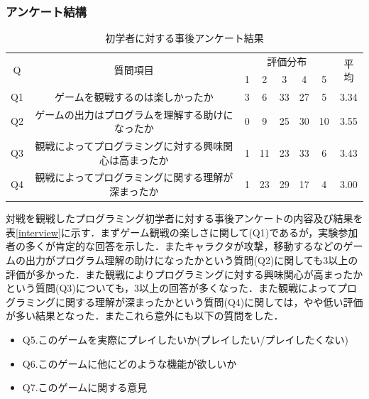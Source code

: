 \subsubsection{アンケート結構}


\begin{table}[h]
  \centering
  \caption{初学者に対する事後アンケート結果}
  \label{beginner_interview}
    \begin{tabular}{|c|c|c|c|c|c|c|c|} \hline
      \multirow{2}{*}{Q} & \multirow{2}{*}{質問項目} & \multicolumn{5}{c}{評価分布} & \multirow{2}{*}{平均} \\
      & & 1 & 2 & 3 & 4 & 5 & \\ \hline\hline
      Q1 & ゲームを観戦するのは楽しかったか & 3 & 6 & 33 & 27 & 5 & 3.34\\ \hline
      Q2 & ゲームの出力はプログラムを理解する助けになったか & 0 & 9 & 25 & 30 & 10 & 3.55\\ \hline
      Q3 & 観戦によってプログラミングに対する興味関心は高まったか & 1 & 11 & 23 & 33 & 6 & 3.43\\ \hline
      Q4 & 観戦によってプログラミングに関する理解が深まったか & 1 & 23 & 29 & 17 & 4 & 3.00\\ \hline
    \end{tabular}
\end{table}

対戦を観戦したプログラミング初学者に対する事後アンケートの内容及び結果を表\ref{interview}に示す．まずゲーム観戦の楽しさに関して(Q1)であるが，実験参加者の多くが肯定的な回答を示した．またキャラクタが攻撃，移動するなどのゲームの出力がプログラム理解の助けになったかという質問(Q2)に関しても3以上の評価が多かった．また観戦によりプログラミングに対する興味関心が高まったかという質問(Q3)についても，3以上の回答が多くなった．また観戦によってプログラミングに関する理解が深まったかという質問(Q4)に関しては，やや低い評価が多い結果となった．またこれら意外にも以下の質問をした．

\begin{itemize}
  \item Q5.このゲームを実際にプレイしたいか(プレイしたい/プレイしたくない)
  \item Q6.このゲームに他にどのような機能が欲しいか
  \item Q7.このゲームに関する意見
\end{itemize}

